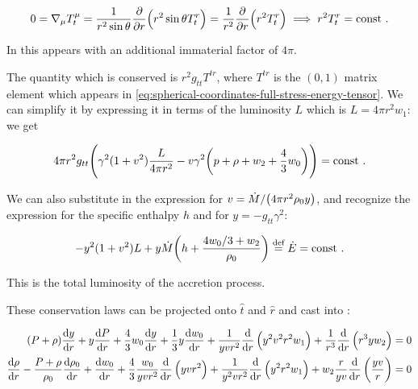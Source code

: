 \documentclass[main.tex]{subfiles}
\begin{document}
\begin{equation}
  0=\nabla_\mu T_t^{\mu}
  = \frac{1}{r^2 \sin \theta} \pdv{}{r} \qty(r^2 \sin\theta T_t^{r})
  = \frac{1}{r^2} \pdv{}{r} \qty(r^2 T_t^{r})
  \implies
  r^2 T_t^{r} = \const \,.
\end{equation}

In \cite[before eq. 18c]{ThorneFLammmangZytkow:1981feb} this appears with an additional immaterial factor of \(4 \pi\).

The quantity which is conserved is \(r^2 g_{tt}T^{tr}\), where \(T^{tr}\) is the $(0,1)$ matrix element which appears in \eqref{eq:spherical-coordinates-full-stress-energy-tensor}. We can simplify it by expressing it in terms of the luminosity \(L\) which is \(L = 4 \pi r^2 w_1\): we get

\begin{equation}
  4 \pi r^2 g_{tt} \qty(\gamma^2 (1+ v^2) \frac{L}{4 \pi r^2} - v \gamma^2 \qty(p + \rho + w_2 + \frac{4}{3} w_0)) = \const\,.
\end{equation}

We can also substitute in the expression for \(v = \dot{M} / \qty(4 \pi r^2 \rho_0 y) \), and recognize the expression for the specific enthalpy \(h\) and for \(y =- g_{tt} \gamma^2\):

\begin{equation}
    -y^2 (1+v^2) L + y \dot{M} \qty(h + \frac{4w_0/3 + w_2}{\rho_0}) \defeq \dot{E}
    = \const\,.
\end{equation}

This is the total luminosity of the accretion process.

\begin{claim}

These conservation laws can be projected onto \(\hat{t}\) and \(\hat{r}\) and cast into \cite[eq. A7]{NobiliTurollaZampieri:1991dec}:

\begin{subequations} \label{eq:fiducial-projected-conservation}
\begin{align}
    (P+\rho) \dv{y}{r}
    +y \dv{P}{r}
    +\frac{4}{3} w_{0} \dv{y}{r}
    +\frac{1}{3} y \dv{w_0}{r}
    +\frac{1}{y v r^{2}} \dv{}{r}\left(y^{2} v^{2} r^{2} w_{1}\right)
    +\frac{1}{r^{3}} \dv{}{r}\left(r^{3} y w_{2}\right) &=0 \\
    \dv{\rho}{r}
    -\frac{P+\rho}{\rho_{0}}
    \dv{\rho_{0}}{r}
    +\dv{w_0}{r}
    +\frac{4}{3} \frac{w_{0}}{y v r^{2}} \dv{}{r}\left(y v r^{2}\right)
    +\frac{1}{y^{2} v r^{2}} \dv{}{r}\left(y^{2} r^{2} w_{1}\right)
    +w_{2} \frac{r}{y v} \dv{}{r}\left(\frac{y v}{r}\right) &=0
\end{align}
\end{subequations}
\end{claim}
\end{document}
